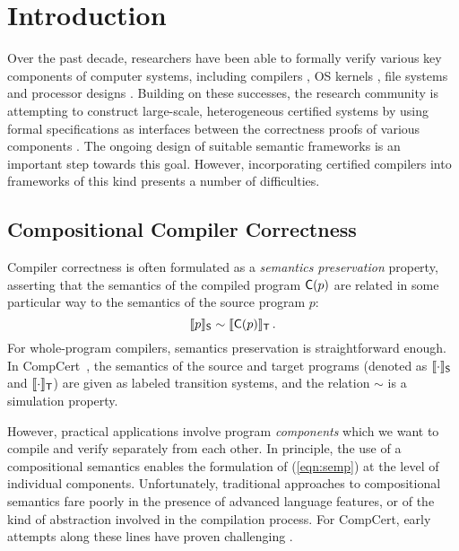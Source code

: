 \section{Introduction}
\label{sec:intro}

Over the past decade, researchers have been able to formally verify
various key components of computer systems, including compilers
\cite{compcert,cakeml,vellvm}, OS kernels \cite{sel4,dscal15,certikos-osdi16},
file systems \cite{fscq} and processor designs \cite{safe,kami}.
Building on these successes, the research community is attempting to
construct large-scale, heterogeneous certified systems by using formal
specifications as interfaces between the correctness proofs of various
components \cite{deepspec}.  The ongoing design of suitable semantic
frameworks is an important step towards this goal.  However,
incorporating certified compilers into frameworks of this kind
presents a number of difficulties.

\subsection{Compositional Compiler Correctness}
\label{ssec:intro-ccc}

Compiler correctness is often formulated as a \emph{semantics
preservation} property, asserting that the semantics of the compiled
program $ \mathsf{C} (p)$ are related in some particular way to the
semantics of the source program $p$:
\begin{equation} \label{eqn:semp}
  \llbracket p \rrbracket_{ \mathsf{S} } \sim
  \llbracket  \mathsf{C} (p) \rrbracket_{ \mathsf{T} }
  \,.
\end{equation}
For whole-program compilers, semantics preservation is straightforward
enough.  In CompCert~\cite{compcert}, the semantics of the source and
target programs (denoted as $\llbracket \cdot \rrbracket_{ \mathsf{S} }$
and $\llbracket \cdot \rrbracket_{ \mathsf{T} }$)
are given as labeled transition systems, and the
relation $\sim$ is a simulation property.

However, practical applications involve program \emph{components}
which we want to compile and verify separately from each other.  In
principle, the use of a compositional semantics enables the
formulation of (\ref{eqn:semp}) at the level of individual components.
Unfortunately, traditional approaches to compositional semantics fare
poorly in the presence of advanced language features, or of the kind
of abstraction involved in the compilation process.  For CompCert,
early attempts along these lines have proven challenging
\cite{cpp15,compcompcert}.

